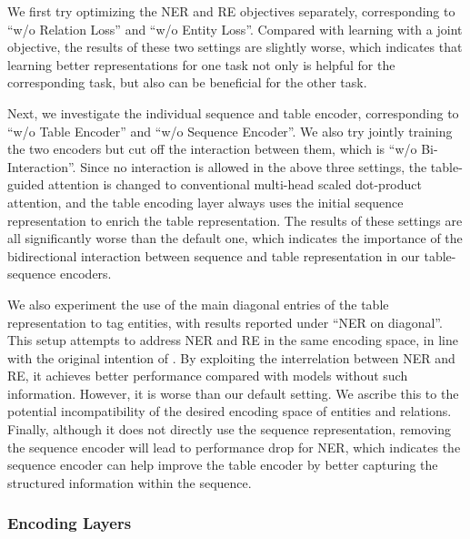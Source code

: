 \documentclass[11pt,a4paper]{article}
\begin{document}
We first try optimizing the NER and RE objectives separately, corresponding to ``w/o Relation Loss'' and ``w/o Entity Loss''.
Compared with learning with a joint objective, the results of these two settings are slightly worse,
which indicates  that learning better representations for one task not only is helpful for the corresponding task, but also can be beneficial for the other task.

Next, we investigate the individual sequence and table encoder, corresponding to ``w/o Table Encoder'' and ``w/o Sequence Encoder''.
We also try jointly training the two encoders but cut off the interaction between them, which is ``w/o Bi-Interaction''.
Since no interaction is allowed in the above three settings, the table-guided attention is changed to conventional multi-head scaled dot-product attention,
and the table encoding layer always uses the initial sequence representation  to enrich the table representation.
The results of these settings are all significantly worse than the default one, which indicates the importance of the bidirectional interaction between sequence and table representation in our table-sequence encoders.

We also experiment the use of the main diagonal entries of the table representation to tag entities, with results reported under ``NER on diagonal''.
This setup attempts to address NER and RE in the same encoding space, in line with the original intention of \citet{miwa2014modeling}.
By exploiting the interrelation between NER and RE, it achieves better performance compared with models without such information.
However, it is worse than our default setting.
We ascribe this to the potential incompatibility of the desired encoding space of entities and relations.
Finally, although it does not directly use the sequence representation, removing the sequence encoder will lead to performance drop for NER, which indicates the sequence encoder can help improve the table encoder by better capturing the structured information within the sequence.

\subsubsection{Encoding Layers}
\end{document}
